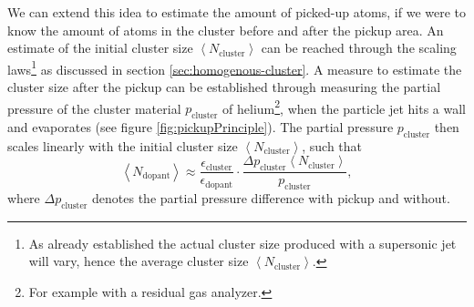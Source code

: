 We can extend this idea to estimate the amount of picked-up atoms, if we were to know the amount of atoms in the cluster before and after the pickup area. An estimate of the initial cluster size $\left\langle N_{\text{cluster}}\right\rangle$ can be reached through the scaling laws\footnote{As already established the actual cluster size produced with a supersonic jet will vary, hence the average cluster size $\left\langle N_{\text{cluster}}\right\rangle$.} as discussed in section \ref{sec:homogenous-cluster}. A measure to estimate the cluster size after the pickup can be established through measuring the partial pressure of the cluster material $p_{\text{cluster}}$ of helium\footnote{For example with a residual gas analyzer.}, when the particle jet hits a wall and evaporates (see figure \ref{fig:pickupPrinciple}). The partial pressure $p_{\text{cluster}}$ then scales linearly with the initial cluster size $\left\langle N_{\text{cluster}}\right\rangle$, such that
\begin{equation}
\left\langle N_{\text{dopant}}\right\rangle \approx \frac{\epsilon_{\text{cluster}}}{\epsilon_{\text{dopant}}} \cdot \frac{\Delta p_{\text{cluster}} \left\langle N_{\text{cluster}}\right\rangle}{p_{\text{cluster}}},
\label{eq:average-dopant}
\end{equation}
where $\Delta p_{\text{cluster}}$ denotes the partial pressure difference with pickup and without.
%
